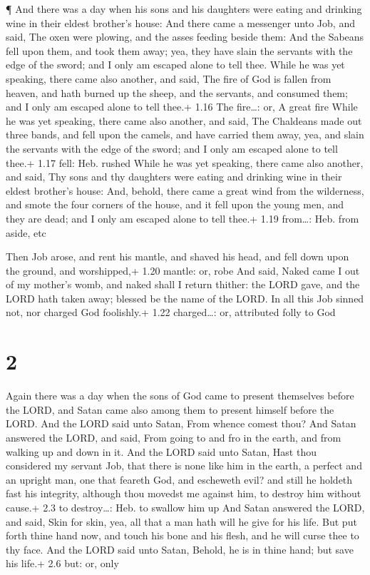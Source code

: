  ¶ And there was a day when his sons and his daughters were
eating and drinking wine in their eldest brother's house: 
And there came a messenger unto Job, and said, The oxen were plowing,
and the asses feeding beside them:  And the Sabeans fell
upon them, and took them away; yea, they have slain the servants with
the edge of the sword; and I only am escaped alone to tell thee.
 While he was yet speaking, there came also another, and
said, The fire of God is fallen from heaven, and hath burned up the
sheep, and the servants, and consumed them; and I only am escaped alone
to tell thee.+ 1.16 The fire\ldots: or, A great fire  While
he was yet speaking, there came also another, and said, The Chaldeans
made out three bands, and fell upon the camels, and have carried them
away, yea, and slain the servants with the edge of the sword; and I only
am escaped alone to tell thee.+ 1.17 fell: Heb. rushed 
While he was yet speaking, there came also another, and said, Thy sons
and thy daughters were eating and drinking wine in their eldest
brother's house:  And, behold, there came a great wind from
the wilderness, and smote the four corners of the house, and it fell
upon the young men, and they are dead; and I only am escaped alone to
tell thee.+ 1.19 from\ldots: Heb. from aside, etc

 Then Job arose, and rent his mantle, and shaved his head,
and fell down upon the ground, and worshipped,+ 1.20 mantle: or, robe
 And said, Naked came I out of my mother's womb, and naked
shall I return thither: the LORD gave, and the LORD hath taken away;
blessed be the name of the LORD.  In all this Job sinned
not, nor charged God foolishly.+ 1.22 charged\ldots: or, attributed
folly to God

\hypertarget{section-1}{%
\section{2}\label{section-1}}

 Again there was a day when the sons of God came to present
themselves before the LORD, and Satan came also among them to present
himself before the LORD.  And the LORD said unto Satan, From
whence comest thou? And Satan answered the LORD, and said, From going to
and fro in the earth, and from walking up and down in it. 
And the LORD said unto Satan, Hast thou considered my servant Job, that
there is none like him in the earth, a perfect and an upright man, one
that feareth God, and escheweth evil? and still he holdeth fast his
integrity, although thou movedst me against him, to destroy him without
cause.+ 2.3 to destroy\ldots: Heb. to swallow him up  And
Satan answered the LORD, and said, Skin for skin, yea, all that a man
hath will he give for his life.  But put forth thine hand
now, and touch his bone and his flesh, and he will curse thee to thy
face.  And the LORD said unto Satan, Behold, he is in thine
hand; but save his life.+ 2.6 but: or, only

